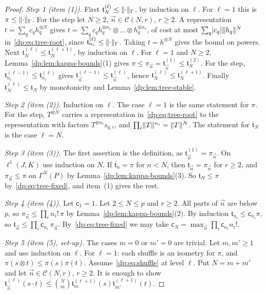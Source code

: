 \begin{proof}
\emph{Step 1 (item (1)).} First $\mathfrak t^{(\ell)}_N\le\lVert \cdot\rVert_\Gamma$, by induction on $\ell$. For $\ell=1$ this is $\pi\le\lVert \cdot\rVert_\Gamma$. For the step let $N\ge2$, $\vec n\in\mathcal C(N,r)$, $r\ge2$. A representation $t=\sum_qc_qh_q^{\otimes N}$ gives $t=\sum_qc_qh_q^{\otimes n_1}\otimes\dots\otimes h_q^{\otimes n_r}$, of cost at most $\sum_q\lvert c_q\rvert\lVert h_q\rVert^N$ in~\eqref{dp:eq:tree-root}, since $\mathfrak t^{(\ell)}_{n_i}\le\lVert \cdot\rVert_\Gamma$. Taking $t=h^{\otimes N}$ gives the bound on powers. Next $\mathfrak t^{(\ell)}_N\le\mathfrak t^{(\ell+1)}_N$, by induction on $\ell$. For $\ell=1$ and $N\ge2$, Lemma~\ref{dp:lem:kappa-bounds}(1) gives $\pi\le\pi_{\vec n}=\mathfrak t^{(1)}_{\vec n}\le\mathfrak t^{(2)}_N$. For the step, $\mathfrak t^{(\ell-1)}_{n_i}\le\mathfrak t^{(\ell)}_{n_i}$ gives $\mathfrak t^{(\ell-1)}_{\vec n}\le\mathfrak t^{(\ell)}_{\vec n}$, hence $\mathfrak t^{(\ell)}_N\le\mathfrak t^{(\ell+1)}_N$. Finally $\mathfrak t^{(\ell)}_N\le\mathfrak t_N$ by monotonicity and Lemma~\ref{dp:lem:tree-stable}.

\emph{Step 2 (item (2)).} Induction on $\ell$. The case $\ell=1$ is the same statement for $\pi$. For the step, $T^{\otimes N}$ carries a representation in~\eqref{dp:eq:tree-root} to the representation with factors $T^{\otimes n_i}s_{q,i}$, and $\prod_i\lVert T\rVert^{n_i}=\lVert T\rVert^N$. The statement for $\mathfrak t_N$ is the case $\ell=N$.

\emph{Step 3 (item (3)).} The first assertion is the definition, as $\mathfrak t^{(1)}_{\vec n}=\pi_{\vec n}$. On $\ell^1(J,K)$ use induction on $N$. If $\mathfrak t_n=\pi$ for $n<N$, then $\mathfrak t_{\vec n}=\pi_{\vec n}$ for $r\ge2$, and $\pi_{\vec n}\le\pi$ on $\Gamma^N(P)$ by Lemma~\ref{dp:lem:kappa-bounds}(3). So $\mathfrak t_N\le\pi$ by~\eqref{dp:eq:tree-fixed}, and item~(1) gives the rest.

\emph{Step 4 (item (4)).} Let $\mathsf c_1=1$. Let $2\le N\le p$ and $r\ge2$. All parts of $\vec n$ are below $p$, so $\pi_{\vec n}\le\prod_in_i!\,\pi$ by Lemma~\ref{dp:lem:kappa-bounds}(2). By induction $\mathfrak t_{n_i}\le\mathsf c_{n_i}\pi$, so $\mathfrak t_{\vec n}\le\prod_i\mathsf c_{n_i}\,\pi_{\vec n}$. By~\eqref{dp:eq:tree-fixed} we may take $\mathsf c_N=\max_{\vec n}\prod_i\mathsf c_{n_i}n_i!$.

\emph{Step 5 (item (5), set-up).} The cases $m=0$ or $m'=0$ are trivial. Let $m,m'\ge1$ and use induction on $\ell$. For $\ell=1$: each shuffle is an isometry for $\pi$, and $\pi(s\otimes t)\le\pi(s)\pi(t)$. Assume~\eqref{dp:eq:shuffle} at level $\ell$. Put $N=m+m'$ and let $\vec n\in\mathcal C(N,r)$, $r\ge2$. It is enough to show $\mathfrak t^{(\ell)}_{\vec n}(s\cdot t)\le\binom Nm\mathfrak t^{(\ell+1)}_m(s)\mathfrak t^{(\ell+1)}_{m'}(t)$.


\end{proof}
